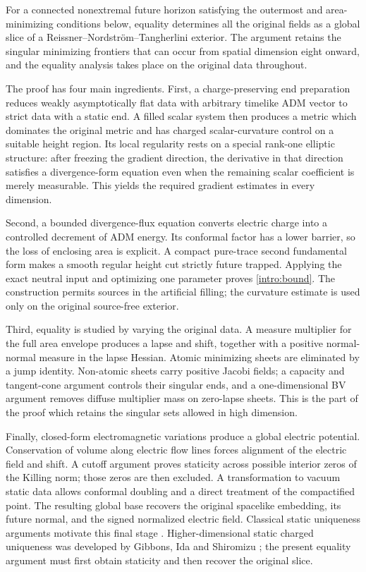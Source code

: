 For a connected nonextremal future horizon satisfying the outermost and area-minimizing conditions below, equality determines all the original fields as a global slice of a Reissner--Nordstr\"om--Tangherlini exterior. The argument retains the singular minimizing frontiers that can occur from spatial dimension eight onward, and the equality analysis takes place on the original data throughout.

The proof has four main ingredients. First, a charge-preserving end preparation reduces weakly asymptotically flat data with arbitrary timelike ADM vector to strict data with a static end. A filled scalar system then produces a metric which dominates the original metric and has charged scalar-curvature control on a suitable height region. Its local regularity rests on a special rank-one elliptic structure: after freezing the gradient direction, the derivative in that direction satisfies a divergence-form equation even when the remaining scalar coefficient is merely measurable. This yields the required gradient estimates in every dimension.

Second, a bounded divergence-flux equation converts electric charge into a controlled decrement of ADM energy. Its conformal factor has a lower barrier, so the loss of enclosing area is explicit. A compact pure-trace second fundamental form makes a smooth regular height cut strictly future trapped. Applying the exact neutral input and optimizing one parameter proves \eqref{intro:bound}. The construction permits sources in the artificial filling; the curvature estimate is used only on the original source-free exterior.

Third, equality is studied by varying the original data. A measure multiplier for the full area envelope produces a lapse and shift, together with a positive normal-normal measure in the lapse Hessian. Atomic minimizing sheets are eliminated by a jump identity. Non-atomic sheets carry positive Jacobi fields; a capacity and tangent-cone argument controls their singular ends, and a one-dimensional BV argument removes diffuse multiplier mass on zero-lapse sheets. This is the part of the proof which retains the singular sets allowed in high dimension.

Finally, closed-form electromagnetic variations produce a global electric potential. Conservation of volume along electric flow lines forces alignment of the electric field and shift. A cutoff argument proves staticity across possible interior zeros of the Killing norm; those zeros are then excluded. A transformation to vacuum static data allows conformal doubling and a direct treatment of the compactified point. The resulting global base recovers the original spacelike embedding, its future normal, and the signed normalized electric field. Classical static uniqueness arguments motivate this final stage \cite{BuntingMasoodulAlam1987,GibbonsIdaShiromizu2002}. Higher-dimensional static charged uniqueness was developed by Gibbons, Ida and Shiromizu \cite{GibbonsIdaShiromizu2002ChargedPRD}; the present equality argument must first obtain staticity and then recover the original slice.

